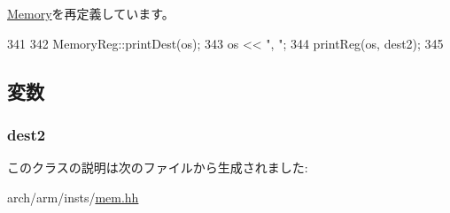 \hyperlink{classArmISA_1_1Memory_a9a9365f7ef96d4838529320970308a57}{Memory}を再定義しています。


\begin{DoxyCode}
341     {
342         MemoryReg::printDest(os);
343         os << ", ";
344         printReg(os, dest2);
345     }
\end{DoxyCode}


\subsection{変数}
\hypertarget{classArmISA_1_1MemoryDReg_a0425ad33e25c8198da341b8d8c01fcba}{
\subsubsection[{dest2}]{ {\bf dest2}}}
\label{classArmISA_1_1MemoryDReg_a0425ad33e25c8198da341b8d8c01fcba}


このクラスの説明は次のファイルから生成されました:\begin{DoxyCompactItemize}
\item 
arch/arm/insts/\hyperlink{arm_2insts_2mem_8hh}{mem.hh}\end{DoxyCompactItemize}
